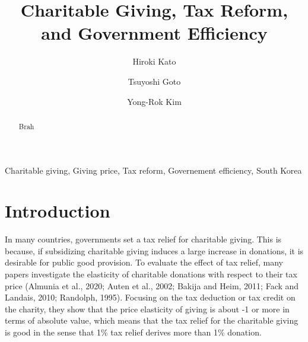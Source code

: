 \documentclass[ review  , 3p ]{elsarticle}
\begin{document}
  \begin{frontmatter}

    \title{Charitable Giving, Tax Reform, and Government Efficiency}
                \author[Osaka University]{
      Hiroki Kato 
       \corref{*} }
        \author[Chiba University]{
      Tsuyoshi Goto 
      }
        \author[Kobe University]{
      Yong-Rok Kim 
      }
            \address[Osaka University]{Graduate School of Economics, Osaka University, Japan}
        \address[Chiba University]{Graduate School of Economics, Chiba University, Japan}
        \address[Kobe University]{Graduate School of Economics, Kobe University, Japan}
      
        \begin{abstract}
      Brah
    \end{abstract}
      
        \begin{keyword}
      Charitable giving, Giving price, Tax reform, Governement efficiency, South Korea
    \end{keyword}
    
  \end{frontmatter}

  \hypertarget{introduction}{%
  \section{Introduction}\label{introduction}}
  
  In many countries, governments set a tax relief for charitable giving. This is because, if subsidizing charitable giving induces a large increase in donations, it is desirable for public good provision. To evaluate the effect of tax relief, many papers investigate the elasticity of charitable donations with respect to their tax price (Almunia et al., 2020; Auten et al., 2002; Bakija and Heim, 2011; Fack and Landais, 2010; Randolph, 1995). Focusing on the tax deduction or tax credit on the charity, they show that the price elasticity of giving is about -1 or more in terms of absolute value, which means that the tax relief for the charitable giving is good in the sense that 1\% tax relief derives more than 1\% donation.
  
\end{document}
